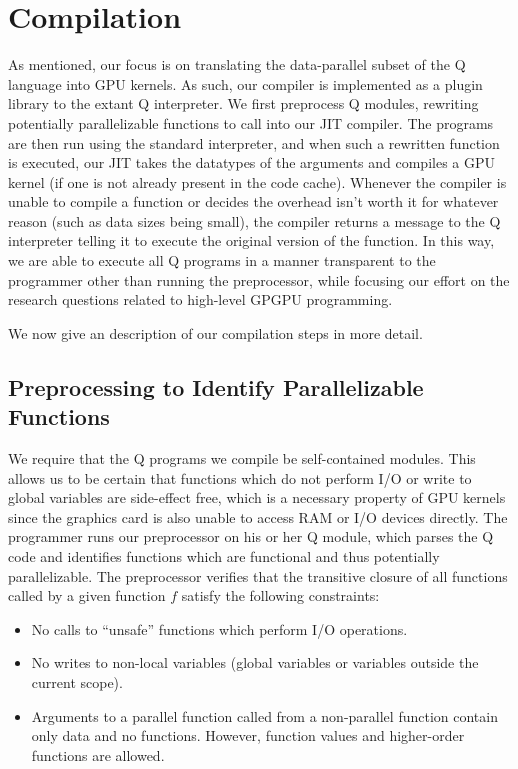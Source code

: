 \documentclass[preprint]{sigplanconf}
\begin{document}
\section{Compilation}
\label{Compilation}

As mentioned, our focus is on translating the data-parallel subset of the Q language into GPU kernels.  As such, our compiler is implemented as a plugin library to the extant Q interpreter.  We first preprocess Q modules, rewriting potentially parallelizable functions to call into our JIT compiler.  The programs are then run using the standard interpreter, and when such a rewritten function is executed, our JIT takes the datatypes of the arguments and compiles a GPU kernel (if one is not already present in the code cache).  Whenever the compiler is unable to compile a function or decides the overhead isn't worth it for whatever reason (such as data sizes being small), the compiler returns a message to the Q interpreter telling it to execute the original version of the function.  In this way, we are able to execute all Q programs in a manner transparent to the programmer other than running the preprocessor, while focusing our effort on the research questions related to high-level GPGPU programming.

We now give an description of our compilation steps in more detail.

\subsection{Preprocessing to Identify Parallelizable Functions}
We require that the Q programs we compile be self-contained modules.  This allows us to be certain that functions which do not perform I/O or write to global variables are side-effect free, which is a necessary property of GPU kernels since the graphics card is also unable to access RAM or I/O devices directly.  The programmer runs our preprocessor on his or her Q module, which parses the Q code and identifies functions which are functional and thus potentially parallelizable.  The preprocessor verifies that the transitive closure of all functions called by a given function $f$ satisfy the following constraints:

\begin{itemize}
\item No calls to ``unsafe'' functions which perform I/O operations.
\item No writes to non-local variables (global variables or variables outside the current scope).
\item Arguments to a parallel function called from a non-parallel function contain only data and no functions.  However, function values and higher-order functions are allowed.
\end{itemize}
\end{document}
